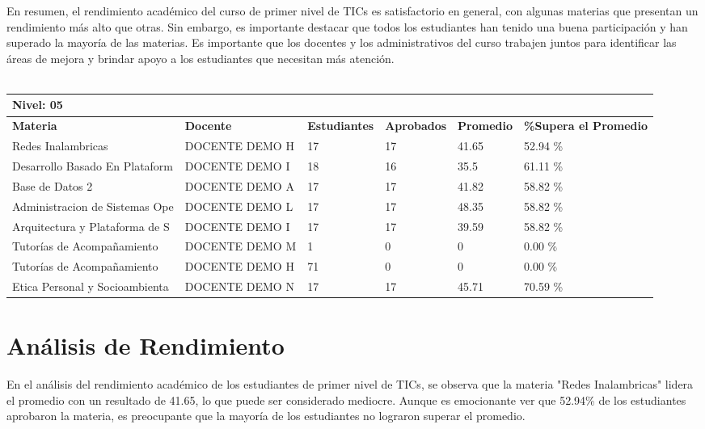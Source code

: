 En resumen, el rendimiento académico del curso de primer nivel de TICs es satisfactorio en general, con algunas materias que presentan un rendimiento más alto que otras. Sin embargo, es importante destacar que todos los estudiantes han tenido una buena participación y han superado la mayoría de las materias. Es importante que los docentes y los administrativos del curso trabajen juntos para identificar las áreas de mejora y brindar apoyo a los estudiantes que necesitan más atención.\\
\vspace{1cm}\\\small
\begin{tabularx}{\textwidth}{|p{2.5cm}|p{2.5cm}|X|X|X|X|}
\hline
\multicolumn{6}{|X|}{\textbf{Nivel: 05 }}\\\hline\textbf{Materia} & \textbf{Docente} & \textbf{Estudiantes} & \textbf{Aprobados} & \textbf{Promedio} & \textbf{\%Supera el Promedio} \\ \hline
Redes Inalambricas & DOCENTE DEMO H & 17 & 17 & 41.65 & 52.94 \%\\ \hline
Desarrollo Basado En Plataform & DOCENTE DEMO I & 18 & 16 & 35.5 & 61.11 \%\\ \hline
Base de Datos 2 & DOCENTE DEMO A & 17 & 17 & 41.82 & 58.82 \%\\ \hline
Administracion de Sistemas Ope & DOCENTE DEMO L & 17 & 17 & 48.35 & 58.82 \%\\ \hline
Arquitectura y Plataforma de S & DOCENTE DEMO I & 17 & 17 & 39.59 & 58.82 \%\\ \hline
Tutorías de Acompañamiento & DOCENTE DEMO M & 1 & 0 & 0 & 0.00 \%\\ \hline
Tutorías de Acompañamiento & DOCENTE DEMO H & 71 & 0 & 0 & 0.00 \%\\ \hline
Etica Personal y Socioambienta & DOCENTE DEMO N & 17 & 17 & 45.71 & 70.59 \%\\ \hline
\end{tabularx}

\vspace{1cm}
\section{Análisis de Rendimiento}
En el análisis del rendimiento académico de los estudiantes de primer nivel de TICs, se observa que la materia "Redes Inalambricas" lidera el promedio con un resultado de 41.65, lo que puede ser considerado mediocre. Aunque es emocionante ver que 52.94\% de los estudiantes aprobaron la materia, es preocupante que la mayoría de los estudiantes no lograron superar el promedio.

